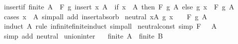 \begin{isabellebody}
\isanewline
%
\endisadelimproof
\isanewline
{}\isamarkupfalse%
\ insert{\isacharunderscore}{\kern0pt}if{\isacharcolon}{\kern0pt}\ {\isachardoublequoteopen}finite\ A\ {\isasymLongrightarrow}\ F\ g\ {\isacharparenleft}{\kern0pt}insert\ x\ A{\isacharparenright}{\kern0pt}\ {\isacharequal}{\kern0pt}\ {\isacharparenleft}{\kern0pt}if\ x\ {\isasymin}\ A\ then\ F\ g\ A\ else\ g\ x\ \isactrlbold {\isacharasterisk}{\kern0pt}\ F\ g\ A{\isacharparenright}{\kern0pt}{\isachardoublequoteclose}\isanewline
%
\isadelimproof
\ \ %
\endisadelimproof
%
\isatagproof
{}\isamarkupfalse%
\ {\isacharparenleft}{\kern0pt}cases\ {\isachardoublequoteopen}x\ {\isasymin}\ A{\isachardoublequoteclose}{\isacharparenright}{\kern0pt}\ {\isacharparenleft}{\kern0pt}simp{\isacharunderscore}{\kern0pt}all\ add{\isacharcolon}{\kern0pt}\ insert{\isacharunderscore}{\kern0pt}absorb{\isacharparenright}{\kern0pt}%
\endisatagproof
{\isafoldproof}%
%
\isadelimproof
\isanewline
%
\endisadelimproof
\isanewline
{}\isamarkupfalse%
\ neutral{\isacharcolon}{\kern0pt}\ {\isachardoublequoteopen}{\isasymforall}x{\isasymin}A{\isachardot}{\kern0pt}\ g\ x\ {\isacharequal}{\kern0pt}\ \ {\isasymLongrightarrow}\ F\ g\ A\ {\isacharequal}{\kern0pt}\ \isanewline
%
\isadelimproof
\ \ %
\endisadelimproof
%
\isatagproof
{}\isamarkupfalse%
\ {\isacharparenleft}{\kern0pt}induct\ A\ rule{\isacharcolon}{\kern0pt}\ infinite{\isacharunderscore}{\kern0pt}finite{\isacharunderscore}{\kern0pt}induct{\isacharparenright}{\kern0pt}\ simp{\isacharunderscore}{\kern0pt}all%
\endisatagproof
{\isafoldproof}%
%
\isadelimproof
\isanewline
%
\endisadelimproof
\isanewline
{}\isamarkupfalse%
\ neutral{\isacharunderscore}{\kern0pt}const\ {\isacharbrackleft}{\kern0pt}simp{\isacharbrackright}{\kern0pt}{\isacharcolon}{\kern0pt}\ {\isachardoublequoteopen}F\ {\isacharparenleft}{\kern0pt}{\isasymlambda}{\isacharunderscore}{\kern0pt}{\isachardot}{\kern0pt}\ \ A\ {\isacharequal}{\kern0pt}\ \isanewline
%
\isadelimproof
\ \ %
\endisadelimproof
%
\isatagproof
{}\isamarkupfalse%
\ {\isacharparenleft}{\kern0pt}simp\ add{\isacharcolon}{\kern0pt}\ neutral{\isacharparenright}{\kern0pt}%
\endisatagproof
{\isafoldproof}%
%
\isadelimproof
\isanewline
%
\endisadelimproof
\isanewline
{}\isamarkupfalse%
\ union{\isacharunderscore}{\kern0pt}inter{\isacharcolon}{\kern0pt}\isanewline
\ \ \ {\isachardoublequoteopen}finite\ A{\isachardoublequoteclose}\ \ {\isachardoublequoteopen}finite\ B{\isachardoublequoteclose}\isanewline

\end{isabellebody}
